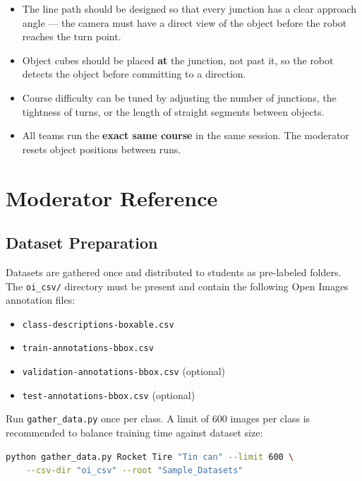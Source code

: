 \documentclass[11pt,a4paper]{article}
\begin{document}
\begin{itemize}
    \item The line path should be designed so that every junction has a clear approach angle — the camera must have a direct view of the object before the robot reaches the turn point.
    \item Object cubes should be placed \textbf{at} the junction, not past it, so the robot detects the object before committing to a direction.
    \item Course difficulty can be tuned by adjusting the number of junctions, the tightness of turns, or the length of straight segments between objects.
    \item All teams run the \textbf{exact same course} in the same session. The moderator resets object positions between runs.
\end{itemize}

\section{Moderator Reference}

\subsection{Dataset Preparation}

Datasets are gathered once and distributed to students as pre-labeled folders. The \texttt{oi\_csv/} directory must be present and contain the following Open Images annotation files:

\begin{itemize}
    \item \texttt{class-descriptions-boxable.csv}
    \item \texttt{train-annotations-bbox.csv}
    \item \texttt{validation-annotations-bbox.csv} (optional)
    \item \texttt{test-annotations-bbox.csv} (optional)
\end{itemize}

Run \texttt{gather\_data.py} once per class. A limit of 600 images per class is recommended to balance training time against dataset size:

\begin{lstlisting}[language=bash]
python gather_data.py Rocket Tire "Tin can" --limit 600 \
    --csv-dir "oi_csv" --root "Sample_Datasets"
\end{lstlisting}
\end{document}
